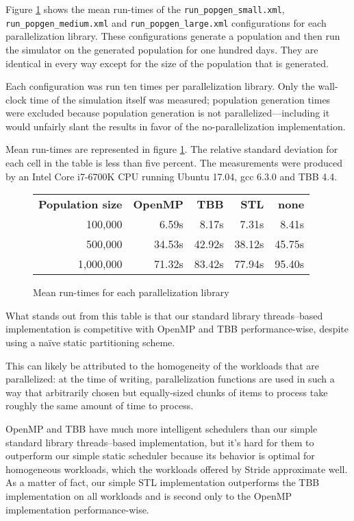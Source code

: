 Figure \ref{fig:parallelization-mean-runtimes} shows the mean run-times of the \texttt{run\_popgen\_small.xml}, \texttt{run\_popgen\_medium.xml} and \texttt{run\_popgen\_large.xml} configurations for each parallelization library. These configurations generate a population and then run the simulator on the generated population for one hundred days. They are identical in every way except for the size of the population that is generated.

Each configuration was run ten times per parallelization library. Only the wall-clock time of the simulation itself was measured; population generation times were excluded because population generation is not parallelized---including it would unfairly slant the results in favor of the no-parallelization implementation.

Mean run-times are represented in figure \ref{fig:parallelization-mean-runtimes}. The relative standard deviation for each cell in the table is less than five percent. The measurements were produced by an Intel Core i7-6700K CPU running Ubuntu 17.04, gcc 6.3.0 and TBB 4.4.

\begin{figure}[h]
	\begin{tabular}{r|r|r|r|r}
		\textbf{Population size} & \textbf{OpenMP} & \textbf{TBB} & \textbf{STL} & \textbf{none} \\
		100,000 & 6.59s & 8.17s & 7.31s & 8.41s \\
		500,000 & 34.53s & 42.92s & 38.12s & 45.75s \\
		1,000,000 & 71.32s & 83.42s & 77.94s & 95.40s
	\end{tabular}
	\label{fig:parallelization-mean-runtimes}
	\caption{Mean run-times for each parallelization library}
\end{figure}

What stands out from this table is that our standard library threads--based implementation is competitive with OpenMP and TBB performance-wise, despite using a na\"ive static partitioning scheme.

This can likely be attributed to the homogeneity of the workloads that are parallelized: at the time of writing, parallelization functions are used in such a way that arbitrarily chosen but equally-sized chunks of items to process take roughly the same amount of time to process.

OpenMP and TBB have much more intelligent schedulers than our simple standard library threads--based implementation, but it's hard for them to outperform our simple static scheduler because its behavior is optimal for homogeneous workloads, which the workloads offered by Stride approximate well. As a matter of fact, our simple STL implementation outperforms the TBB implementation on all workloads and is second only to the OpenMP implementation performance-wise.